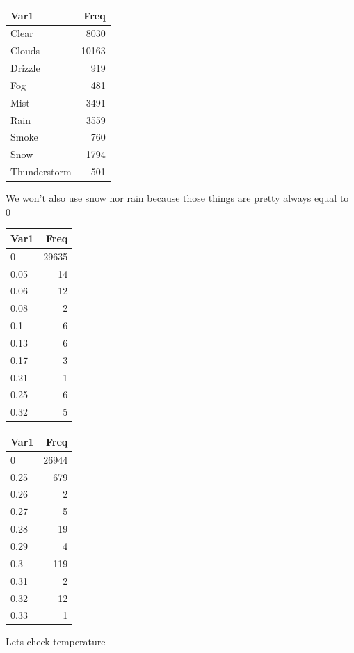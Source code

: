 \documentclass[
]{article}
\newenvironment{Shaded}{\begin{snugshade}}{\end{snugshade}}
\newcommand{\DecValTok}[1]{\textcolor[rgb]{0.00,0.00,0.81}{#1}}
\newcommand{\KeywordTok}[1]{\textcolor[rgb]{0.13,0.29,0.53}{\textbf{#1}}}
\newcommand{\NormalTok}[1]{#1}
\newcommand{\OperatorTok}[1]{\textcolor[rgb]{0.81,0.36,0.00}{\textbf{#1}}}
\begin{document}
\begin{longtable}[]{@{}lr@{}}
\toprule
Var1 & Freq\tabularnewline
\midrule
\endhead
Clear & 8030\tabularnewline
Clouds & 10163\tabularnewline
Drizzle & 919\tabularnewline
Fog & 481\tabularnewline
Mist & 3491\tabularnewline
Rain & 3559\tabularnewline
Smoke & 760\tabularnewline
Snow & 1794\tabularnewline
Thunderstorm & 501\tabularnewline
\bottomrule
\end{longtable}

We won't also use snow nor rain because those things are pretty always
equal to 0

\begin{Shaded}
\end{Shaded}

\begin{longtable}[]{@{}lr@{}}
\toprule
Var1 & Freq\tabularnewline
\midrule
\endhead
0 & 29635\tabularnewline
0.05 & 14\tabularnewline
0.06 & 12\tabularnewline
0.08 & 2\tabularnewline
0.1 & 6\tabularnewline
0.13 & 6\tabularnewline
0.17 & 3\tabularnewline
0.21 & 1\tabularnewline
0.25 & 6\tabularnewline
0.32 & 5\tabularnewline
\bottomrule
\end{longtable}

\begin{Shaded}
\end{Shaded}

\begin{longtable}[]{@{}lr@{}}
\toprule
Var1 & Freq\tabularnewline
\midrule
\endhead
0 & 26944\tabularnewline
0.25 & 679\tabularnewline
0.26 & 2\tabularnewline
0.27 & 5\tabularnewline
0.28 & 19\tabularnewline
0.29 & 4\tabularnewline
0.3 & 119\tabularnewline
0.31 & 2\tabularnewline
0.32 & 12\tabularnewline
0.33 & 1\tabularnewline
\bottomrule
\end{longtable}

Lets check temperature

\begin{Shaded}
\end{Shaded}
\end{document}
